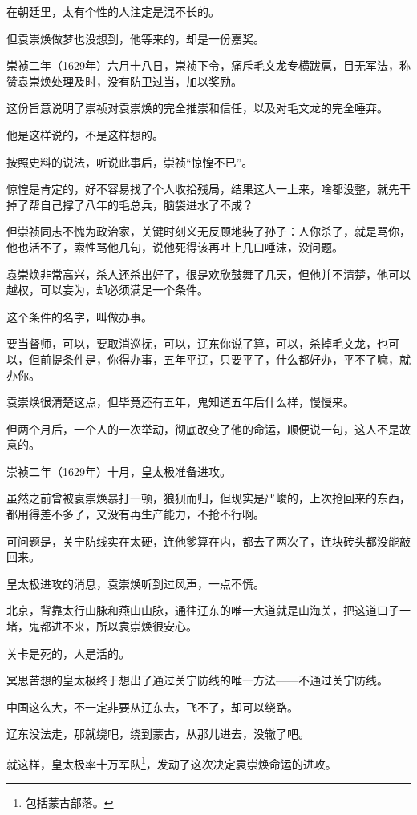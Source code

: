\begin{multicols}{\theparacolNo}
		在朝廷里，太有个性的人注定是混不长的。

		但袁崇焕做梦也没想到，他等来的，却是一份嘉奖。

		崇祯二年（1629年）六月十八日，崇祯下令，痛斥毛文龙专横跋扈，目无军法，称赞袁崇焕处理及时，没有防卫过当，加以奖励。

		这份旨意说明了崇祯对袁崇焕的完全推崇和信任，以及对毛文龙的完全唾弃。

		他是这样说的，不是这样想的。

		按照史料的说法，听说此事后，崇祯“惊惶不已”。

		惊惶是肯定的，好不容易找了个人收拾残局，结果这人一上来，啥都没整，就先干掉了帮自己撑了八年的毛总兵，脑袋进水了不成？

		但崇祯同志不愧为政治家，关键时刻义无反顾地装了孙子：人你杀了，就是骂你，他也活不了，索性骂他几句，说他死得该再吐上几口唾沫，没问题。

		袁崇焕非常高兴，杀人还杀出好了，很是欢欣鼓舞了几天，但他并不清楚，他可以越权，可以妄为，却必须满足一个条件。

		这个条件的名字，叫做办事。

		要当督师，可以，要取消巡抚，可以，辽东你说了算，可以，杀掉毛文龙，也可以，但前提条件是，你得办事，五年平辽，只要平了，什么都好办，平不了嘛，就办你。

		袁崇焕很清楚这点，但毕竟还有五年，鬼知道五年后什么样，慢慢来。

		但两个月后，一个人的一次举动，彻底改变了他的命运，顺便说一句，这人不是故意的。

		崇祯二年（1629年）十月，皇太极准备进攻。

		虽然之前曾被袁崇焕暴打一顿，狼狈而归，但现实是严峻的，上次抢回来的东西，都用得差不多了，又没有再生产能力，不抢不行啊。

		可问题是，关宁防线实在太硬，连他爹算在内，都去了两次了，连块砖头都没能敲回来。

		皇太极进攻的消息，袁崇焕听到过风声，一点不慌。

		北京，背靠太行山脉和燕山山脉，通往辽东的唯一大道就是山海关，把这道口子一堵，鬼都进不来，所以袁崇焕很安心。

		关卡是死的，人是活的。

		冥思苦想的皇太极终于想出了通过关宁防线的唯一方法——不通过关宁防线。

		中国这么大，不一定非要从辽东去，飞不了，却可以绕路。

		辽东没法走，那就绕吧，绕到蒙古，从那儿进去，没辙了吧。

		就这样，皇太极率十万军队\footnote{包括蒙古部落。}，发动了这次决定袁崇焕命运的进攻。


\end{multicols}
